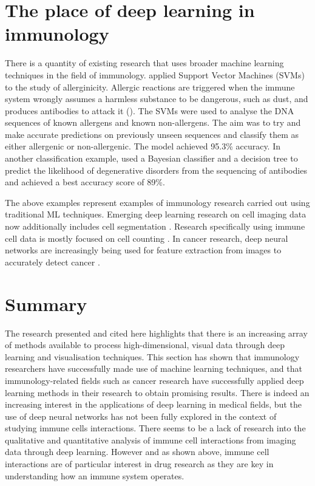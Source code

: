 \section{The place of deep learning in immunology}

There is a quantity of existing research that uses broader machine learning techniques in the field of immunology. \citet{muh_allerhunter_2009} applied Support Vector Machines (SVMs) to the study of allerginicity. Allergic reactions are triggered when the immune system wrongly assumes a harmless substance to be dangerous, such as dust, and produces antibodies to attack it  (\cite{https://www.immunology.org/policy-and-public-affairs/briefings-and-position-statements/allergy}). The SVMs were used to analyse the DNA sequences of known allergens and known non-allergens. The aim was to try and make accurate predictions on previously unseen sequences and classify them as either allergenic or non-allergenic. The model achieved 95.3\% accuracy.  In another classification example, \citet{david_using_2010} used a Bayesian classifier and a decision tree to predict the likelihood of degenerative disorders from the sequencing of antibodies and achieved a best accuracy score of 89\%. 

The above examples represent examples of immunology research carried out using traditional ML techniques. Emerging deep learning research on cell imaging data now additionally includes cell segmentation \citep{al-kofahi_deep_2018}. Research specifically using immune cell data is mostly focused on cell counting \citep{turkki_antibody-supervised_2016, aprupe_robust_2019}. In cancer research, deep neural networks are increasingly being used for feature extraction from images to accurately detect cancer \citep{litjens_deep_2016, bychkov_deep_2018}.

\section{Summary}

The research presented and cited here highlights that there is an increasing array of methods available to process high-dimensional, visual data through deep learning and visualisation techniques. This section has shown that immunology researchers have successfully made use of machine learning techniques, and that immunology-related fields such as cancer research have successfully applied deep learning methods in their research to obtain promising results. There is indeed an increasing interest in the applications of deep learning in medical fields, but the use of deep neural networks has not been fully explored in the context of studying immune cells interactions. There seems to be a lack of research into the qualitative and quantitative analysis of immune cell interactions from imaging data through deep learning. However and as shown above, immune cell interactions are of particular interest in drug research as they are key in understanding how an immune system operates.

